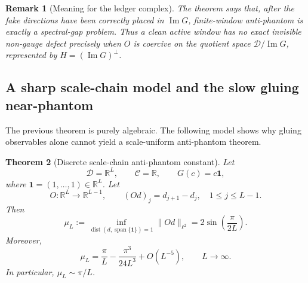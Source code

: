 \documentclass[11pt]{article}
\numberwithin{equation}{section}
\newtheorem{theorem}{Theorem}[section]
\newtheorem{remark}[theorem]{Remark}
\newcommand{\R}{\mathbb R}
\newcommand{\calC}{\mathcal C}
\newcommand{\calD}{\mathcal D}
\newcommand{\Image}{\operatorname{Im}}
\newcommand{\Dist}{\operatorname{dist}}
\begin{document}
\begin{remark}[Meaning for the ledger complex]
The theorem says that, after the fake directions have been correctly placed in $\Image G$, finite-window anti-phantom is exactly a spectral-gap problem.  Thus a clean active window has no exact invisible non-gauge defect precisely when $O$ is coercive on the quotient space $\calD/\Image G$, represented by $H=(\Image G)^\perp$.
\end{remark}

\subsection{A sharp scale-chain model and the slow gluing near-phantom}

The previous theorem is purely algebraic.  The following model shows why gluing observables alone cannot yield a scale-uniform anti-phantom theorem.


\begin{theorem}[Discrete scale-chain anti-phantom constant]\label{thm:scale-chain-antiphantom}
Let
\[
    \calD=\R^L,
    \qquad
    \calC=\R,
    \qquad
    G(c)=c\mathbf 1,
\]
where $\mathbf 1=(1,\ldots,1)\in\R^L$.  Let
\[
    O:\R^L\to\R^{L-1},
    \qquad
    (Od)_j=d_{j+1}-d_j,
    \quad 1\le j\le L-1.
\]
Then
\begin{equation}\label{eq:scale-chain-mu}
    \mu_L
    :=
    \inf_{\Dist(d,\operatorname{span}\{\mathbf 1\})=1}
    \|Od\|_{\ell^2}
    =
    2\sin\left(\frac{\pi}{2L}\right).
\end{equation}
Moreover,
\begin{equation}\label{eq:scale-chain-asymptotic}
    \mu_L
    =
    \frac{\pi}{L}-\frac{\pi^3}{24L^3}+O(L^{-5}),
    \qquad L\to\infty.
\end{equation}
In particular, $\mu_L\sim\pi/L$.
\end{theorem}
\end{document}
